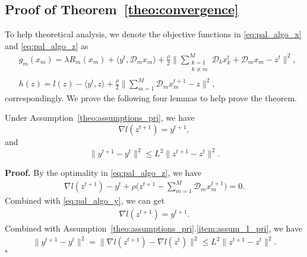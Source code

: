 \subsection{Proof of Theorem~\ref{theo:convergence}}
To help theoretical analysis, we denote the objective functions in \eqref{eq:pal_algo_x} and \eqref{eq:pal_algo_z} as
\begin{align}
    & g_m(x_m) = \lambda R_m(x_m) + \langle y^t, \mathcal{D}_mx_m\rangle + \frac{\rho}{2}\big\|\sum_{\substack{k=1\\k\neq m}}^{M} \mathcal{D}_kx_k^t+ \mathcal{D}_mx_m - z^t\big\|^2,\nonumber\\
    & h(z) = l(z)  - \langle y^t, z \rangle + \frac{\rho}{2} \big\|\sum_{m=1}^{M}\mathcal{D}_mx_m^{t+1} - z\big\|^2,
\end{align}
correspondingly. We prove the following four lemmas to help prove the theorem. 
\begin{lemma}\label{lemma:y_diff_bound}
Under Assumption~\ref{theo:assumptions_pri}, we have
\[
    \nabla l(z^{t+1}) = y^{t+1},
\]
and
\[
    \|y^{t+1} - y^t\|^2 \le L^2\|z^{t+1} - z^{t}\|^2.
\]
\end{lemma}
{\bf Proof.} By the optimality in \eqref{eq:pal_algo_z}, we have
\begin{align}
    \nabla l(z^{t+1}) - y^t + \rho\big(z^{t+1} - \sum_{m=1}^{M} \mathcal{D}_mx_m^{t+1}\big) = 0.\nonumber
\end{align}
Combined with \eqref{eq:pal_algo_y}, we can get
\begin{align}
    \nabla l(z^{t+1}) = y^{t+1}.
\end{align}
Combined with Assumption~\ref{theo:assumptions_pri}.\ref{item:assum_1_pri}, we have
\begin{align}
\|y^{t+1} - y^{t}\|^2 = \|\nabla l(z^{t+1}) - \nabla l(z^{t})\|^2 \le L^2\|z^{t+1} - z^t\|^2.
\end{align}
\hfill$\square$

